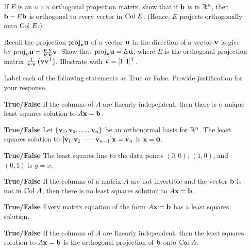 \item If $E$ is an $n \times n$ orthogonal projection matrix, show that if $\mathbf{b}$ is in $\mathbb{R}^n$, then $\mathbf{b} - E\mathbf{b}$ is orthogonal to every vector in $\text{Col } E$. (Hence, $E$ projects orthogonally onto $\text{Col } E$.)
		
\item Recall the projection $\text{proj}_{\mathbf{v}} \mathbf{u}$ of a vector $\mathbf{u}$  in the direction of a vector $\mathbf{v}$ is give by $\text{proj}_{\mathbf{v}} \mathbf{u} = \frac{\mathbf{u} \cdot \mathbf{v}}{\mathbf{v} \cdot \mathbf{v}} \mathbf{v}$. Show that $\text{proj}_{\mathbf{v}} \mathbf{u} = E\mathbf{u}$, where $E$ is the orthogonal projection matrix $\frac{1}{\mathbf{v} \cdot \mathbf{v}} \left(\mathbf{v} \mathbf{v}^{\mathsf{T}} \right)$. Illustrate with $\vv = [1 \ 1]^{\tr}$. 

\ea

 \item Label each of the following statements as True or False. Provide justification for your response.
\ba	
\item \textbf{True/False} If the columns of $A$ are linearly independent, then there is a unique least squares solution to $A\mathbf{x} = \mathbf{b}$.

\item \textbf{True/False} Let $\{\mathbf{v}_1, \mathbf{v}_2, \ldots, \mathbf{v}_n\}$ be an orthonormal basis for $\mathbb{R}^n$. The least squares solution to $[\mathbf{v}_1 \ \mathbf{v}_2 \ \cdots \ \mathbf{v}_{n-1}] \mathbf{x} = \mathbf{v}_n$ is $\mathbf{x} = \mathbf{0}$.


\item \textbf{True/False} The least squares line to the data points $(0,0)$, $(1,0)$, and $(0,1)$ is $y=x$. 

\item \textbf{True/False} If the columns of a matrix $A$ are not invertible and the vector $\mathbf{b}$ is not in $\text{Col } A$, then there is no least squares solution to $A \mathbf{x} = \mathbf{b}$. 

\item \textbf{True/False} Every matrix equation of the form $A \mathbf{x} = \mathbf{b}$ has a least squares solution.

\item \textbf{True/False} If the columns of $A$ are linearly independent, then the least squares solution to $A \mathbf{x} = \mathbf{b}$ is the orthogonal projection of $\mathbf{b}$ onto $\text{Col } A$. 

\ea




\ee



